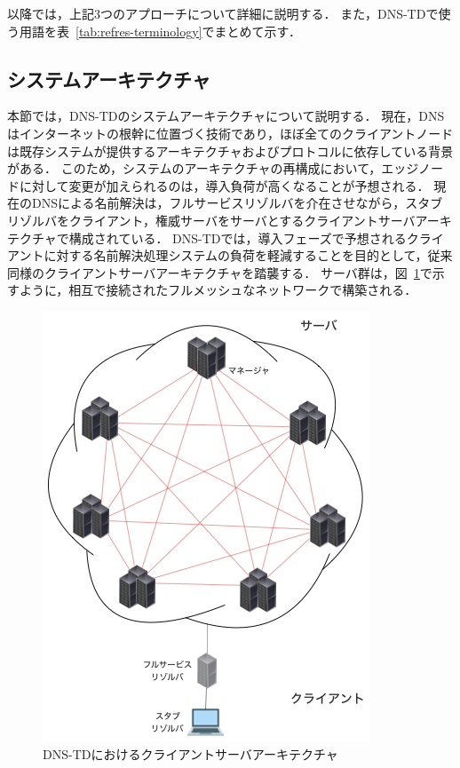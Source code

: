 以降では，上記3つのアプローチについて詳細に説明する．
また，DNS-TDで使う用語を表~\ref{tab:refres-terminology}でまとめて示す．



\newpage
\subsection{システムアーキテクチャ}
\label{sec:system-architecture}
本節では，DNS-TDのシステムアーキテクチャについて説明する．
現在，DNSはインターネットの根幹に位置づく技術であり，ほぼ全てのクライアントノードは既存システムが提供するアーキテクチャおよびプロトコルに依存している背景がある．
このため，システムのアーキテクチャの再構成において，エッジノードに対して変更が加えられるのは，導入負荷が高くなることが予想される．
現在のDNSによる名前解決は，フルサービスリゾルバを介在させながら，スタブリゾルバをクライアント，権威サーバをサーバとするクライアントサーバアーキテクチャで構成されている．
DNS-TDでは，導入フェーズで予想されるクライアントに対する名前解決処理システムの負荷を軽減することを目的として，従来同様のクライアントサーバアーキテクチャを踏襲する．
サーバ群は，図~\ref{fig:system-architecture}で示すように，相互で接続されたフルメッシュなネットワークで構築される．
\begin{figure}[htbp]
 \centering
 \includegraphics[scale=0.5]{figure/system-architecture.png}
 \caption{DNS-TDにおけるクライアントサーバアーキテクチャ}
 \label{fig:system-architecture}
\end{figure}

